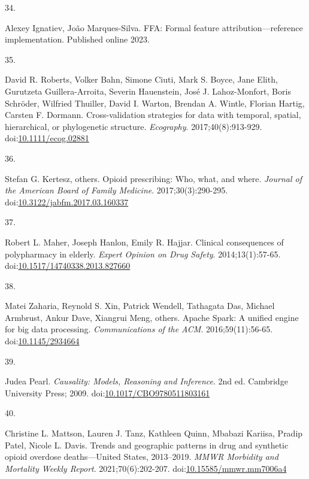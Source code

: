 \documentclass[
  12pt,
]{book}
\newlength{\cslhangindent}
\newlength{\csllabelwidth}
\newenvironment{CSLReferences}[2] %
 {\begin{list}{}{%
  \setlength{\itemindent}{0pt}
  \setlength{\leftmargin}{0pt}
  \setlength{\parsep}{0pt}
  \ifodd #1
   \setlength{\leftmargin}{\cslhangindent}
   \setlength{\itemindent}{-1\cslhangindent}
  \fi
  \setlength{\itemsep}{#2\baselineskip}}}
 {\end{list}}
\newcommand{\CSLLeftMargin}[1]{\parbox[t]{\csllabelwidth}{\strut#1\strut}}
\newcommand{\CSLRightInline}[1]{\parbox[t]{\linewidth - \csllabelwidth}{\strut#1\strut}}
\begin{document}
\begin{CSLReferences}{0}{1}
\CSLLeftMargin{34. }%
\CSLRightInline{Alexey Ignatiev, João Marques-Silva. {FFA}: Formal
feature attribution---reference implementation. Published online 2023.}

\CSLLeftMargin{35. }%
\CSLRightInline{David R. Roberts, Volker Bahn, Simone Ciuti, Mark S.
Boyce, Jane Elith, Gurutzeta Guillera-Arroita, Severin Hauenstein, José
J. Lahoz-Monfort, Boris Schröder, Wilfried Thuiller, David I. Warton,
Brendan A. Wintle, Florian Hartig, Carsten F. Dormann. Cross-validation
strategies for data with temporal, spatial, hierarchical, or
phylogenetic structure. \emph{Ecography}. 2017;40(8):913-929.
doi:\href{https://doi.org/10.1111/ecog.02881}{10.1111/ecog.02881}}

\CSLLeftMargin{36. }%
\CSLRightInline{Stefan G. Kertesz, others. Opioid prescribing: Who,
what, and where. \emph{Journal of the American Board of Family
Medicine}. 2017;30(3):290-295.
doi:\href{https://doi.org/10.3122/jabfm.2017.03.160337}{10.3122/jabfm.2017.03.160337}}

\CSLLeftMargin{37. }%
\CSLRightInline{Robert L. Maher, Joseph Hanlon, Emily R. Hajjar.
Clinical consequences of polypharmacy in elderly. \emph{Expert Opinion
on Drug Safety}. 2014;13(1):57-65.
doi:\href{https://doi.org/10.1517/14740338.2013.827660}{10.1517/14740338.2013.827660}}

\CSLLeftMargin{38. }%
\CSLRightInline{Matei Zaharia, Reynold S. Xin, Patrick Wendell,
Tathagata Das, Michael Armbrust, Ankur Dave, Xiangrui Meng, others.
Apache {Spark}: A unified engine for big data processing.
\emph{Communications of the ACM}. 2016;59(11):56-65.
doi:\href{https://doi.org/10.1145/2934664}{10.1145/2934664}}

\CSLLeftMargin{39. }%
\CSLRightInline{Judea Pearl. \emph{Causality: Models, Reasoning and
Inference}. 2nd ed. Cambridge University Press; 2009.
doi:\href{https://doi.org/10.1017/CBO9780511803161}{10.1017/CBO9780511803161}}

\CSLLeftMargin{40. }%
\CSLRightInline{Christine L. Mattson, Lauren J. Tanz, Kathleen Quinn,
Mbabazi Kariisa, Pradip Patel, Nicole L. Davis. Trends and geographic
patterns in drug and synthetic opioid overdose deaths---{United States},
2013--2019. \emph{MMWR Morbidity and Mortality Weekly Report}.
2021;70(6):202-207.
doi:\href{https://doi.org/10.15585/mmwr.mm7006a4}{10.15585/mmwr.mm7006a4}}


\end{CSLReferences}
\end{document}
